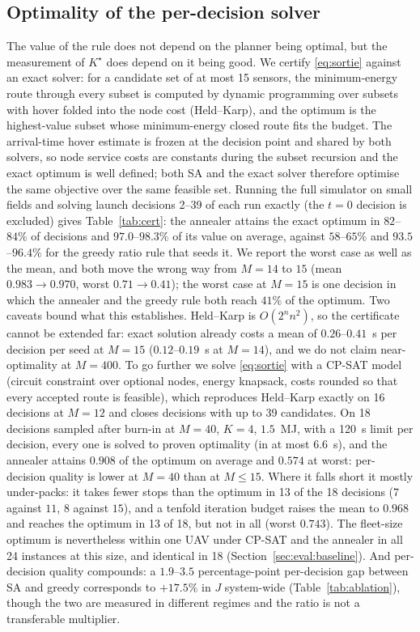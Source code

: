 \documentclass[journal,outdir=./]{IEEEtran}
\begin{document}
\subsection{Optimality of the per-decision solver}\label{sec:planner:cert}
The value of the rule does not depend on the planner being optimal, but the measurement of $K^{\star}$ does depend on it being good. We certify \eqref{eq:sortie} against an exact solver: for a candidate set of at most 15 sensors, the minimum-energy route through every subset is computed by dynamic programming over subsets with hover folded into the node cost (Held--Karp), and the optimum is the highest-value subset whose minimum-energy closed route fits the budget. The arrival-time hover estimate is frozen at the decision point and shared by both solvers, so node service costs are constants during the subset recursion and the exact optimum is well defined; both SA and the exact solver therefore optimise the same objective over the same feasible set. Running the full simulator on small fields and solving launch decisions 2--39 of each run exactly (the $t=0$ decision is excluded) gives Table~\ref{tab:cert}: the annealer attains the exact optimum in $82$--$84\%$ of decisions and $97.0$--$98.3\%$ of its value on average, against $58$--$65\%$ and $93.5$--$96.4\%$ for the greedy ratio rule that seeds it. We report the worst case as well as the mean, and both move the wrong way from $M=14$ to $15$ (mean $0.983\to0.970$, worst $0.71\to0.41$); the worst case at $M=15$ is one decision in which the annealer and the greedy rule both reach $41\%$ of the optimum. Two caveats bound what this establishes. Held--Karp is $O(2^nn^2)$, so the certificate cannot be extended far: exact solution already costs a mean of $0.26$--$0.41$~s per decision per seed at $M=15$ ($0.12$--$0.19$~s at $M=14$), and we do not claim near-optimality at $M=400$. To go further we solve \eqref{eq:sortie} with a CP-SAT model (circuit constraint over optional nodes, energy knapsack, costs rounded so that every accepted route is feasible), which reproduces Held--Karp exactly on 16 decisions at $M=12$ and closes decisions with up to 39 candidates. On 18 decisions sampled after burn-in at $M=40$, $K=4$, $1.5$~MJ, with a 120~s limit per decision, every one is solved to proven optimality (in at most $6.6$~s), and the annealer attains $0.908$ of the optimum on average and $0.574$ at worst: per-decision quality is lower at $M=40$ than at $M\le15$. Where it falls short it mostly under-packs: it takes fewer stops than the optimum in 13 of the 18 decisions ($7$ against $11$, $8$ against $15$), and a tenfold iteration budget raises the mean to $0.968$ and reaches the optimum in 13 of 18, but not in all (worst $0.743$). The fleet-size optimum is nevertheless within one UAV under CP-SAT and the annealer in all 24 instances at this size, and identical in 18 (Section~\ref{sec:eval:baseline}). And per-decision quality compounds: a $1.9$--$3.5$ percentage-point per-decision gap between SA and greedy corresponds to $+17.5\%$ in $J$ system-wide (Table~\ref{tab:ablation}), though the two are measured in different regimes and the ratio is not a transferable multiplier.
\end{document}
